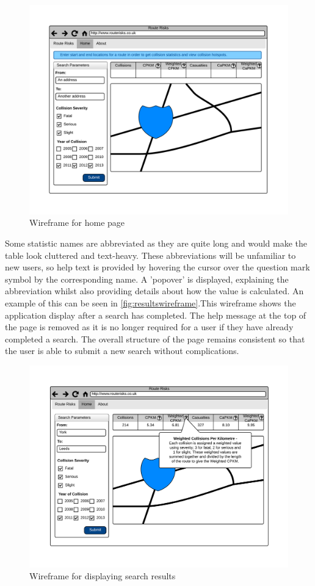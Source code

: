 \documentclass[authoryearcitations]{UoYCSproject}
\begin{document}
\begin{figure}
	\center
	\includegraphics[scale=0.7]{HomePageWireframe}
	\caption{Wireframe for home page}
	\label{fig:homewireframe}
\end{figure}

Some statistic names are abbreviated as they are quite long and would make the table look cluttered and text-heavy. These abbreviations will be unfamiliar to new users, so help text is provided by hovering the cursor over the question mark symbol by the corresponding name. A 'popover' is displayed, explaining the abbreviation whilst also providing details about how the value is calculated. An example of this can be seen in \autoref{fig:resultswireframe}.This wireframe shows the application display after a search has completed. The help message at the top of the page is removed as it is no longer required for a user if they have already completed a search. The overall structure of the page remains consistent so that the user is able to submit a new search without complications.

\begin{figure}
	\center
	\includegraphics[scale=0.7]{ResultsWireframe}
	\caption{Wireframe for displaying search results}
	\label{fig:resultswireframe}
\end{figure}
\end{document}
